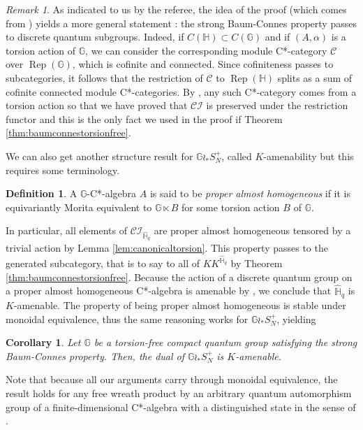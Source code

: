 \documentclass[a4paper, 11pt]{amsart}
\theoremstyle{plain}
\newtheorem{cor}[thm]{Corollary}
\theoremstyle{definition}
\newtheorem{de}[thm]{Definition}
\theoremstyle{remark}
\newtheorem{rem}[thm]{Remark}
\DeclareMathOperator{\Rep}{Rep}
\newcommand{\CC}{\mathcal{C}}
\newcommand{\CI}{\mathcal{CI}}
\newcommand{\G}{\mathbb{G}}
\newcommand{\HH}{\mathbb{H}}
\begin{document}
\begin{rem}
As indicated to us by the referee, the idea of the proof (which comes from \cite[Thm 5.2]{voigt2015structure}) yields a more general statement : the strong Baum-Connes property passes to discrete quantum subgroups. Indeed, if $C(\HH)\subset C(\G)$ and if $(A, \alpha)$ is a torsion action of $\G$, we can consider the corresponding module C*-category $\CC$ over $\Rep(\G)$, which is cofinite and connected. Since cofiniteness passes to subcategories, it follows that the restriction of $\CC$ to $\Rep(\HH)$ splits as a sum of cofinite connected module C*-categories. By \cite[Lem 3.11]{arano2015torsion}, any such C*-category comes from a torsion action so that we have proved that $\CI$ is preserved under the restriction functor and this is the only fact we used in the proof if Theorem \ref{thm:baumconnestorsionfree}.
\end{rem}

We can also get another structure result for $\G\wr_{*}S_{N}^{+}$, called $K$-amenability but this requires some terminology.

\begin{de}
A $\G$-C*-algebra $A$ is said to be \emph{proper almost homogeneous} if it is equivariantly Morita equivalent to $\G\ltimes B$ for some torsion action $B$ of $\G$.
\end{de}

In particular, all elements of $\CI_{\widehat{\HH}_{q}}$ are proper almost homogeneous tensored by a trivial action by Lemma \ref{lem:canonicaltorsion}. This property passes to the generated subcategory, that is to say to all of $KK^{\widehat{\HH}_{q}}$ by Theorem \ref{thm:baumconnestorsionfree}. Because the action of a discrete quantum group on a proper almost homogeneous C*-algebra is amenable by \cite[Lem 4.6]{voigt2015structure}, we conclude that $\widehat{\HH}_{q}$ is $K$-amenable. The property of being proper almost homogeneous is stable under monoidal equivalence, thus the same reasoning works for $\G\wr_{\ast} S_{N}^{+}$, yielding

\begin{cor}
Let $\G$ be a torsion-free compact quantum group satisfying the strong Baum-Connes property. Then, the dual of $\G\wr_{\ast}S_{N}^{+}$ is $K$-amenable.
\end{cor}

Note that because all our arguments carry through monoidal equivalence, the result holds for any free wreath product by an arbitrary quantum automorphism group of a finite-dimensional C*-algebra with a distinguished state in the sense of \cite{fima2015free}.
\end{document}
